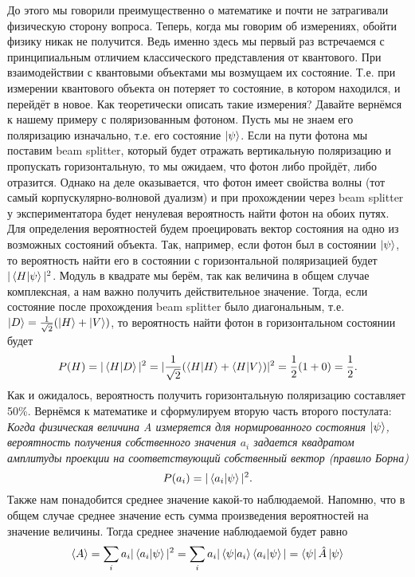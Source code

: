 До этого мы говорили преимущественно о математике и почти не затрагивали физическую сторону вопроса. Теперь, когда мы говорим об измерениях, обойти физику никак не получится. Ведь именно здесь мы первый раз встречаемся с принципиальным отличием классического представления от квантового. При взаимодействии с квантовыми объектами мы возмущаем их состояние. Т.е. при измерении квантового объекта он потеряет то состояние, в котором находился, и перейдёт в новое. Как теоретически описать такие измерения? Давайте вернёмся к нашему примеру с поляризованным фотоном. Пусть мы не знаем его поляризацию изначально, т.е. его состояние $\ket{\psi}$. Если на пути фотона мы поставим beam splitter, который будет отражать вертикальную поляризацию и пропускать горизонтальную, то мы ожидаем, что фотон либо пройдёт, либо отразится. Однако на деле оказывается, что фотон имеет свойства волны (тот самый корпускулярно-волновой дуализм) и при прохождении через beam splitter у экспериментатора будет ненулевая вероятность найти фотон на обоих путях. Для определения вероятностей будем проецировать вектор состояния на одно из возможных состояний объекта. Так, например, если фотон был в состоянии $\ket{\psi}$, то вероятность найти его в состоянии с горизонтальной поляризацией будет $|\bra{H}\ket{\psi}|^2$. Модуль в квадрате мы берём, так как величина в общем случае комплексная, а нам важно получить действительное значение. Тогда, если состояние после прохождения beam splitter было диагональным, т.е. $\ket{D} = \frac{1}{\sqrt{2}}(\ket{H} + \ket{V})$, то вероятность найти фотон в горизонтальном состоянии будет
\[
P(H) = |\bra{H}\ket{D}|^2 = |\frac{1}{\sqrt{2}} (\bra{H}\ket{H} + \bra{H}\ket{V})|^2 = \frac{1}{2}(1 + 0) = \frac{1}{2}.
\]
Как и ожидалось, вероятность получить горизонтальную поляризацию составляет 50\%.
Вернёмся к математике и сформулируем вторую часть второго постулата: \textit{Когда физическая величина A измеряется для нормированного состояния $\ket{\psi}$, вероятность получения собственного значения $a_i$ задается квадратом амплитуды проекции на соответствующий собственный вектор (правило Борна)}
\[
P(a_i) = |\bra{a_i}\ket{\psi}|^2.
\]
Также нам понадобится среднее значение какой-то наблюдаемой. Напомню, что в общем случае среднее значение есть сумма произведения вероятностей на значение величины. Тогда среднее значение наблюдаемой будет равно
\[
\langle A \rangle = \sum_i a_i |\bra{a_i}\ket{\psi}|^2 = \sum_i a_i |\bra{\psi}\ket{a_i}\bra{a_i}\ket{\psi}| = \bra{\psi}\hat{A}\ket{\psi}
\]
